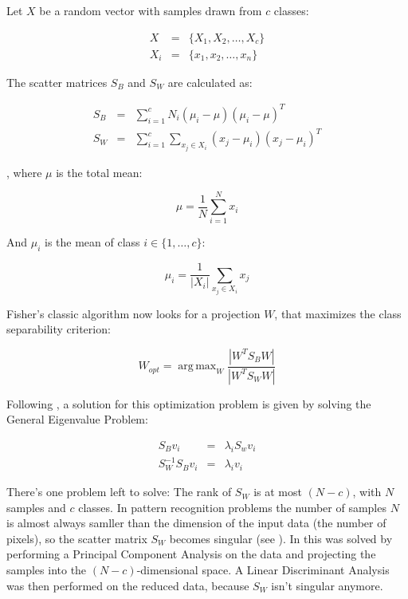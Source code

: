 Let $X$ be a random vector with samples drawn from $c$ classes:

\begin{eqnarray}
X & = & \{X_1,X_2,\ldots,X_c\} \\
X_i & = & \{x_1, x_2, \ldots, x_n\}
\end{eqnarray}

The scatter matrices $S_{B}$ and $S_{W}$ are calculated as:

\begin{eqnarray}
\label{eqn:scatter_matrices}
S_{B} & = & \sum_{i=1}^{c} N_{i} (\mu_i - \mu)(\mu_i - \mu)^{T} \\
S_{W} & = & \sum_{i=1}^{c} \sum_{x_{j} \in X_{i}} (x_j - \mu_i)(x_j - \mu_i)^{T}
\end{eqnarray}

, where $\mu$ is the total mean:

\begin{equation}
\mu = \frac{1}{N} \sum_{i=1}^{N} x_i
\end{equation}

And $\mu_i$ is the mean of class $i \in \{1,\ldots,c\}$:

\begin{equation}
\mu_i = \frac{1}{|X_i|} \sum_{x_j \in X_i} x_j
\end{equation}

Fisher's classic algorithm now looks for a projection $W$, that maximizes the class separability criterion:

\begin{equation}
W_{opt} = \operatorname{arg\,max}_{W} \frac{|W^T S_B W|}{|W^T S_W W|}
\end{equation}

Following \cite{belhumeru97}, a solution for this optimization problem is given by solving the General Eigenvalue Problem:

\begin{eqnarray}
\label{eqn:general_eigenwert}
S_{B} v_{i} & = & \lambda_{i} S_w v_{i} \nonumber \\
S_{W}^{-1} S_{B} v_{i} & = & \lambda_{i} v_{i}
\end{eqnarray}

There's one problem left to solve: The rank of $S_{W}$ is at most $(N-c)$, with $N$ samples and $c$ classes. In pattern recognition problems the number of samples $N$ is almost always samller than the dimension of the input data (the number of pixels), so the scatter matrix $S_{W}$ becomes singular (see \cite{Raudys1991}). In \cite{belhumeru97} this was solved by performing a Principal Component Analysis on the data and projecting the samples into the $(N-c)$-dimensional space. A Linear Discriminant Analysis was then performed on the reduced data, because $S_{W}$ isn't singular anymore.


